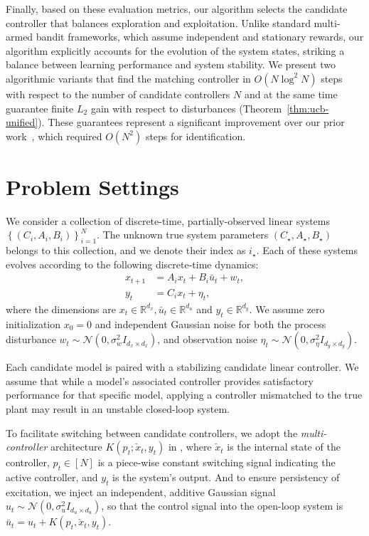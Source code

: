 \documentclass[11pt, twoside]{article}
\theoremstyle{definition}
\newcommand{\RR}{\mathbb{R}}
\begin{document}
Finally, based on these evaluation metrics, our algorithm selects the candidate controller that balances exploration and exploitation.
Unlike standard multi-armed bandit frameworks, which assume independent and stationary rewards, our algorithm explicitly accounts for the evolution of the system states, striking a balance between learning performance and system stability.
We present two algorithmic variants that find the matching controller in $O(N \log^2 N)$ steps with respect to the number of candidate controllers $N$ and at the same time guarantee finite $L_2$ gain with respect to disturbances (Theorem~\ref{thm:ucb-unified}).
These guarantees represent a significant improvement over our prior work~\cite{sun2024least}, which required $O(N^2)$ steps for identification.



 
\section{Problem Settings}


We consider a collection of discrete-time, partially-observed linear systems $\left\{(C_i, A_i, B_i)\right\}_{i=1}^N$.
The unknown true system parameters $(C_\star, A_\star, B_\star)$ belongs to this collection, and we denote their index as $i_\star$. 
Each of these systems evolves according to the following discrete-time dynamics:
\begin{align*}
    x_{t+1} &= A_i x_t + B_i \bar{u}_t + w_t, \\
    y_t &= C_i x_t + \eta_t,
\end{align*}
where the dimensions are $x_t \in \RR^{d_x}, \bar{u}_t \in \RR^{d_u}$ and $y_t \in \RR^{d_y}$.
We assume zero initialization $x_0 = 0$ and independent Gaussian noise for both the process disturbance $w_t \sim \mathcal{N}(0, \sigma_w^2 I_{d_x \times d_x})$, and observation noise $\eta_t \sim \mathcal{N}(0, \sigma_\eta^2 I_{d_y \times d_y})$.

Each candidate model is paired with a stabilizing candidate linear controller. We assume that while a model's associated controller provides satisfactory performance for that specific model, applying a controller mismatched to the true plant may result in an unstable closed-loop system.

To facilitate switching between candidate controllers, we adopt the \textit{multi-controller} architecture $K(p_t; \check{x}_t, y_t)$ in \citep{hespanha2001tutorial}, where $\check{x}_t$ is the internal state of the controller, $p_t \in [N]$ is a piece-wise constant switching signal indicating the active controller, and $y_t$ is the system's output.
And to ensure persistency of excitation, we inject an independent, additive Gaussian signal $u_t \sim \mathcal{N}(0, \sigma_u^2 I_{d_u \times d_u})$, so that the control signal into the open-loop system is $\bar{u}_t = u_t + K(p_t, \check{x}_t, y_t)$.
\end{document}
